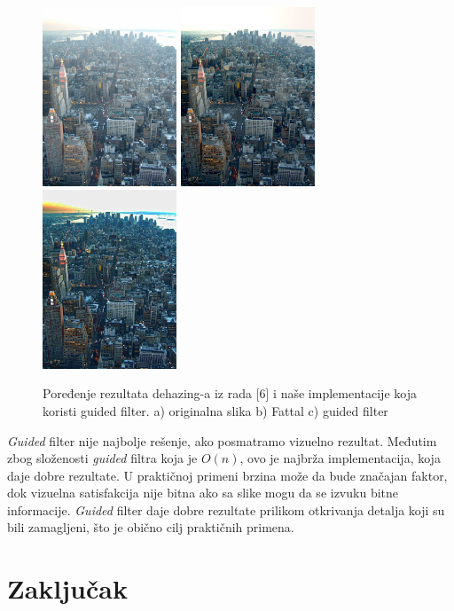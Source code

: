 \documentclass[a4paper,12pt,titlepage]{article}
\begin{document}
\begin{figure}[ht!]
\centering
\includegraphics[width=40mm]{img/grad.jpg}
\includegraphics[width=40mm]{img/gradFattal.jpg}
\includegraphics[width=40mm]{img/gradDe.png}
\caption{Poređenje rezultata dehazing-a iz rada [6] i naše implementacije koja koristi guided filter. a) originalna slika b) Fattal c) guided filter}
\label{grad}
\end{figure} 

\emph{Guided} filter nije najbolje rešenje, ako posmatramo vizuelno rezultat. Međutim zbog složenosti \emph{guided} filtra koja je $O(n)$, ovo je najbrža implementacija, koja daje dobre rezultate. U praktičnoj primeni brzina može da bude značajan faktor, dok vizuelna satisfakcija nije bitna ako sa slike mogu da se izvuku bitne informacije. \emph{Guided} filter daje dobre rezultate prilikom otkrivanja detalja koji su bili zamagljeni, što je obično cilj praktičnih primena.

\section{Zaključak}%
\end{document}

